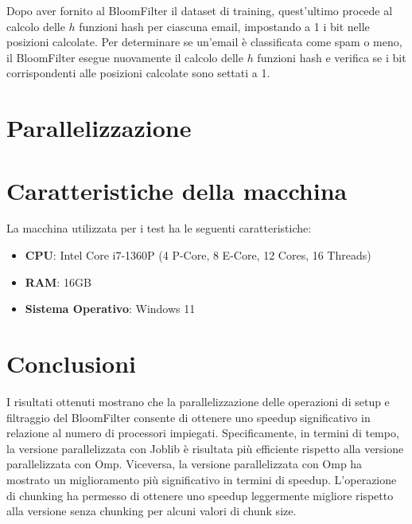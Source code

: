 \documentclass[11pt]{article}
\begin{document}
    Dopo aver fornito al BloomFilter il dataset di training, quest'ultimo procede al calcolo delle $h$ funzioni hash per ciascuna email,
    impostando a 1 i bit nelle posizioni calcolate.
    Per determinare se un'email è classificata come spam o meno, il BloomFilter esegue nuovamente il calcolo delle $h$
    funzioni hash e verifica se i bit corrispondenti alle posizioni calcolate sono settati a 1.

    \section{Parallelizzazione}\label{sec:parallelizazzione}
    

    \section{Caratteristiche della macchina}\label{sec:caratteristiche-della-macchina}
    La macchina utilizzata per i test ha le seguenti caratteristiche:
    \begin{itemize}
        \item \textbf{CPU}: Intel Core i7-1360P (4 P-Core, 8 E-Core, 12 Cores, 16 Threads)
        \item \textbf{RAM}: 16GB
        \item \textbf{Sistema Operativo}: Windows 11
    \end{itemize}

    

    \section{Conclusioni}\label{sec:conclusioni}
    I risultati ottenuti mostrano che la parallelizzazione delle operazioni di setup e filtraggio del BloomFilter
    consente di ottenere uno speedup significativo in relazione al numero di processori impiegati.
    Specificamente, in termini di tempo, la versione parallelizzata con Joblib è risultata più efficiente rispetto
    alla versione parallelizzata con Omp.
    Viceversa, la versione parallelizzata con Omp ha mostrato un miglioramento più significativo in termini di speedup.
    L'operazione di chunking ha permesso di ottenere uno speedup leggermente migliore rispetto alla versione senza chunking
    per alcuni valori di chunk size.

    \clearpage

    \appendix
    
\end{document}

